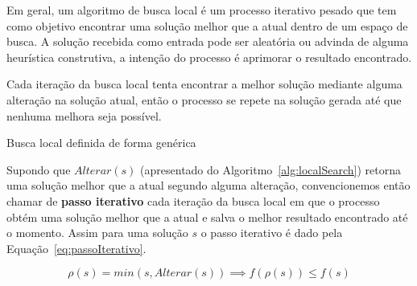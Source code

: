 Em geral, um algoritmo de busca local é um processo iterativo pesado que tem como objetivo encontrar uma solução melhor que a atual dentro de um espaço de busca.
A solução recebida como entrada pode ser aleatória ou advinda de alguma heurística construtiva, a intenção do processo é aprimorar o resultado encontrado.

Cada iteração da busca local tenta encontrar a melhor solução mediante alguma alteração na solução atual, então o processo se repete na solução gerada até que nenhuma melhora seja possível.

\begin{algorithm}[htpb]
\caption{Busca local definida de forma genérica}
\label{alg:localSearch}
\begin{algorithmic}[1]
         
        \EndWhile
         
    \EndFunction
\end{algorithmic}
\end{algorithm}

Supondo que $Alterar(s)$ (apresentado do Algoritmo~\ref{alg:localSearch}) retorna uma solução melhor que a atual segundo alguma alteração, convencionemos então chamar de \textbf{passo iterativo} cada iteração da busca local em que o processo obtém uma solução melhor que a atual e salva o melhor resultado encontrado até o momento.
Assim para uma solução $s$ o passo iterativo é dado pela Equação~\ref{eq:passoIterativo}.

\begin{equation} \label{eq:passoIterativo}
\rho(s) = min(s, Alterar(s)) \implies f(\rho(s)) \le f(s)
\end{equation}
